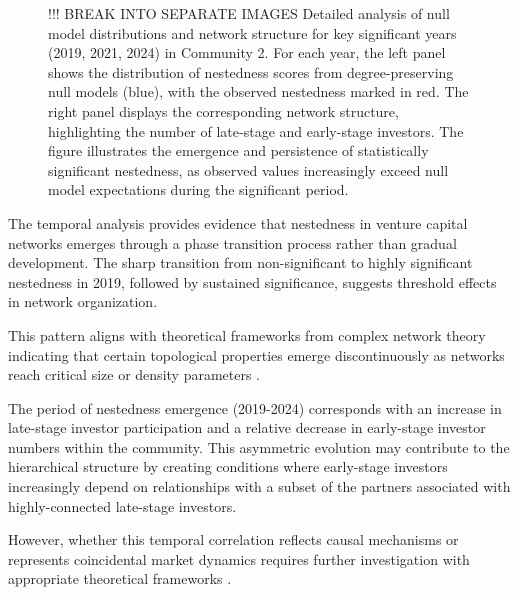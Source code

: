 \begin{figure}[htbp]
\caption{!!! BREAK INTO SEPARATE IMAGES Detailed analysis of null model distributions and network structure for key significant years (2019, 2021, 2024) in Community 2. For each year, the left panel shows the distribution of nestedness scores from degree-preserving null models (blue), with the observed nestedness marked in red. The right panel displays the corresponding network structure, highlighting the number of late-stage and early-stage investors. The figure illustrates the emergence and persistence of statistically significant nestedness, as observed values increasingly exceed null model expectations during the significant period.}
\label{fig:null_model_distributions_significant_years}
\end{figure}

The temporal analysis provides evidence that nestedness in venture capital networks emerges through a phase transition process rather than gradual development. The sharp transition from non-significant to highly significant nestedness in 2019, followed by sustained significance, suggests threshold effects in network organization. 

This pattern aligns with theoretical frameworks from complex network theory indicating that certain topological properties emerge discontinuously as networks reach critical size or density parameters \cite{Mariani2019}.


The period of nestedness emergence (2019-2024) corresponds with an increase in late-stage investor participation and a relative decrease in early-stage investor numbers within the community. This asymmetric evolution may contribute to the hierarchical structure by creating conditions where early-stage investors increasingly depend on relationships with a subset of the partners associated with highly-connected late-stage investors. 


However, whether this temporal correlation reflects causal mechanisms or represents coincidental market dynamics requires further investigation with appropriate theoretical frameworks \cite{Dalle2025}.

